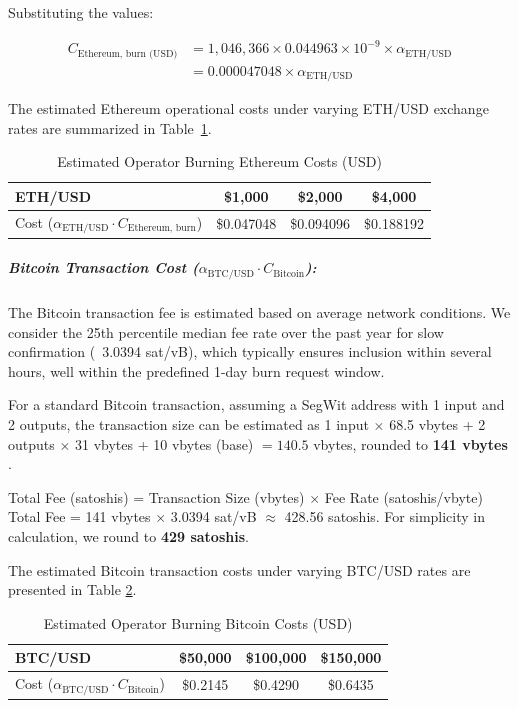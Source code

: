 \documentclass{DESSThesis}
\begin{document}
Substituting the values:

\begin{align*}
C_{\text{Ethereum, burn (USD)}} &= 1,\!046,\!366 \times 0.044963 \times 10^{-9} \times \alpha_{\text{ETH/USD}} \\
&= 0.000047048 \times \alpha_{\text{ETH/USD}}
\end{align*}

The estimated Ethereum operational costs under varying ETH/USD exchange rates are summarized in Table~\ref{tab:burning_eth_cost}.


\begin{table}[h!]
\caption{Estimated Operator Burning Ethereum Costs (USD)}
\label{tab:burning_eth_cost}
\centering
\begin{tabular}{|l|c|c|c|}
\hline
\textbf{ETH/USD} & \textbf{\$1,000} & \textbf{\$2,000} & \textbf{\$4,000} \\
\hline
Cost (\(\alpha_{\text{ETH/USD}} \cdot C_{\text{Ethereum, burn}}\)) & \$0.047048 & \$0.094096 & \$0.188192 \\
\hline
\end{tabular}
\end{table}

\subparagraph{Bitcoin Transaction Cost (\(\alpha_{\text{BTC/USD}} \cdot C_{\text{Bitcoin}}\)):}
The Bitcoin transaction fee is estimated based on average network conditions. We consider the 25th percentile median fee rate over the past year for slow confirmation (~3.0394 sat/vB), which typically ensures inclusion within several hours, well within the predefined 1-day burn request window. \cite{noauthor_bitcoin_2025}

For a standard Bitcoin transaction, assuming a SegWit address with 1 input and 2 outputs, the transaction size can be estimated as 1 input \(\times\) 68.5 vbytes + 2 outputs \(\times\) 31 vbytes + 10 vbytes (base) \(= 140.5\) vbytes, rounded to \textbf{141 vbytes} \cite{noauthor_bitcoin_nodate}.

Total Fee (satoshis) = Transaction Size (vbytes) \(\times\) Fee Rate (satoshis/vbyte)
Total Fee = 141 vbytes \(\times\) 3.0394 sat/vB \(\approx\) 428.56 satoshis. For simplicity in calculation, we round to \textbf{429 satoshis}.

The estimated Bitcoin transaction costs under varying BTC/USD rates are presented in Table \ref{tab:burning_btc_cost}.

\begin{table}[h!]
\caption{Estimated Operator Burning Bitcoin Costs (USD)}
\label{tab:burning_btc_cost}
\centering
\begin{tabular}{|l|c|c|c|}
\hline
\textbf{BTC/USD} & \textbf{\$50,000} & \textbf{\$100,000} & \textbf{\$150,000} \\
\hline
Cost (\(\alpha_{\text{BTC/USD}} \cdot C_{\text{Bitcoin}}\)) & \$0.2145 & \$0.4290 & \$0.6435 \\
\hline
\end{tabular}
\end{table}
\end{document}

